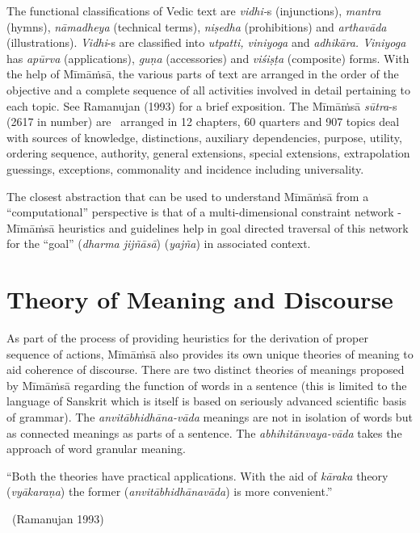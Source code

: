 The functional classifications of Vedic text are \textit{vidhi-}s (injunctions),\textit{ mantra} (hymns), \textit{nāmadheya} (technical terms), \textit{niṣedha} (prohibitions) and \textit{arthavāda} (illustrations). \textit{Vidhi}-s are classified into \textit{utpatti, viniyoga} and \textit{adhikāra. Viniyoga} has \textit{apūrva} (applications), \textit{guṇa} (accessories) and \textit{viśiṣṭa} (composite) forms. With the help of Mīmāṁsā, the various parts of text are arranged in the order of the objective and a complete sequence of all activities involved in detail pertaining to each topic. See Ramanujan (1993) for a brief exposition. The Mīmāṁsā \textit{sūtra}-s (2617 in number) are  arranged in 12 chapters, 60 quarters and 907 topics deal with sources of knowledge, distinctions, auxiliary dependencies, purpose, utility, ordering sequence, authority, general extensions, special extensions, extrapolation guessings, exceptions, commonality and incidence including universality.

The closest abstraction that can be used to understand Mīmāṁsā from a “computational” perspective is that of a multi-dimensional constraint network - Mīmāṁsā heuristics and guidelines help in goal directed traversal of this network for the “goal” (\textit{dharma jijñāsā}) (\textit{yajña}) in associated context.


\section*{Theory of Meaning and Discourse}

As part of the process of providing heuristics for the derivation of proper sequence of actions, Mīmāṁsā also provides its own unique theories of meaning to aid coherence of discourse. There are two distinct theories of meanings proposed by Mīmāṁsā regarding the function of words in a sentence (this is limited to the language of Sanskrit which is itself is based on seriously advanced scientific basis of grammar). The \textit{anvitābhidhāna-vāda} meanings are not in isolation of words but as connected meanings as parts of a sentence. The \textit{abhihitānvaya-vāda} takes the approach of word granular meaning.

\begin{myquote}
“Both the theories have practical applications. With the aid of \textit{kāraka} theory (\textit{vyākaraṇa}) the former (\textit{anvitābhidhānavāda}) is more convenient.”

~\hfill (Ramanujan 1993)
\end{myquote}


